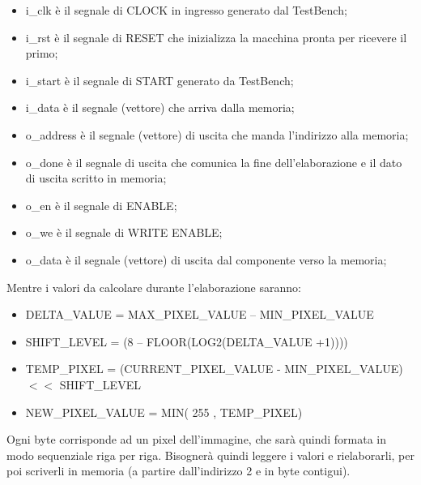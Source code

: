 \documentclass{article}
\begin{document}
\begin{itemize}
\item i_clk è il segnale di CLOCK in ingresso generato dal TestBench;
\item i_rst è il segnale di RESET che inizializza la macchina pronta per ricevere il primo;
\item i_start è il segnale di START generato da TestBench;
\item i_data è il segnale (vettore) che arriva dalla memoria;
\item o_address è il segnale (vettore) di uscita che manda l’indirizzo alla memoria;
\item o_done è il segnale di uscita che comunica la fine dell’elaborazione e il dato di uscita scritto in memoria;
\item o_en è il segnale di ENABLE;
\item o_we è il segnale di WRITE ENABLE;
\item o_data è il segnale (vettore) di uscita dal componente verso la memoria;
\end{itemize}
Mentre i valori da calcolare durante l'elaborazione saranno:
\newline
\begin{itemize}
\item DELTA_VALUE = MAX_PIXEL_VALUE – MIN_PIXEL_VALUE
\item SHIFT_LEVEL = (8 – FLOOR(LOG2(DELTA_VALUE +1))))
\item TEMP_PIXEL = (CURRENT_PIXEL_VALUE - MIN_PIXEL_VALUE) \(<<\) SHIFT_LEVEL
\item NEW_PIXEL_VALUE = MIN( 255 , TEMP_PIXEL)
\end{itemize}

Ogni byte corrisponde ad un pixel dell’immagine, che sarà quindi formata in modo sequenziale riga per riga. Bisognerà quindi leggere i valori e rielaborarli, per poi scriverli in memoria (a partire dall’indirizzo 2 e in byte contigui).
\end{document}

